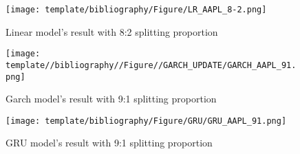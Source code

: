 \documentclass{ieeeojies}
\begin{document}
\begin{figure}[H]
  \centering
  \begin{minipage}{0.8\linewidth}
    \centering
    \texttt{[image: template/bibliography/Figure/LR\_AAPL\_8-2.png]}
    \caption{Linear model's result with 8:2 splitting proportion}
    \label{fig8}
  \end{minipage}
\end{figure}

\begin{figure}[H]
  \centering
  \begin{minipage}{0.8\linewidth}
    \centering
    \texttt{[image: template//bibliography//Figure//GARCH\_UPDATE/GARCH\_AAPL\_91.png]}
    \caption{Garch model's result with 9:1 splitting proportion}
    \label{fig9}
  \end{minipage}
\end{figure}

\begin{figure}[H]
  \centering
  \begin{minipage}{0.8\linewidth}
    \centering
    \texttt{[image: template/bibliography/Figure/GRU/GRU\_AAPL\_91.png]}
    \caption{GRU model's result with 9:1 splitting proportion}
    \label{fig13}
  \end{minipage}
\end{figure}
\end{document}
